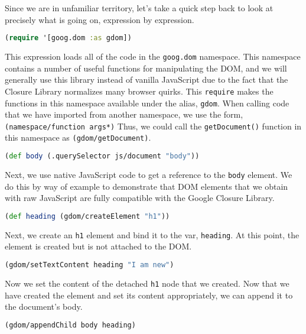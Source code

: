 \documentclass[10pt,twoside,openright]{memoir}
\begin{document}
Since we are in unfamiliar territory, let's take a quick step back to
look at precisely what is going on, expression by expression.

\begin{lstlisting}[language=Clojure]
(require '[goog.dom :as gdom])
\end{lstlisting}

This expression loads all of the code in the \texttt{goog.dom}
namespace. This namespace contains a number of useful functions for
manipulating the DOM, and we will generally use this library instead of
vanilla JavaScript due to the fact that the Closure Library normalizes
many browser quirks. This \texttt{require} makes the functions in this
namespace available under the alias, \texttt{gdom}. When calling code
that we have imported from another namespace, we use the form,
\texttt{(namespace/function\ args*)} Thus, we could call the
\texttt{getDocument()} function in this namespace as
\texttt{(gdom/getDocument)}.

\begin{lstlisting}[language=Clojure]
(def body (.querySelector js/document "body"))
\end{lstlisting}

Next, we use native JavaScript code to get a reference to the
\texttt{body} element. We do this by way of example to demonstrate that
DOM elements that we obtain with raw JavaScript are fully compatible
with the Google Closure Library.

\begin{lstlisting}[language=Clojure]
(def heading (gdom/createElement "h1"))
\end{lstlisting}

Next, we create an \texttt{h1} element and bind it to the var,
\texttt{heading}. At this point, the element is created but is not
attached to the DOM.

\begin{lstlisting}[language=Clojure]
(gdom/setTextContent heading "I am new")
\end{lstlisting}

Now we set the content of the detached \texttt{h1} node that we created.
Now that we have created the element and set its content appropriately,
we can append it to the document's body.

\begin{lstlisting}[language=Clojure]
(gdom/appendChild body heading)
\end{lstlisting}
\end{document}
